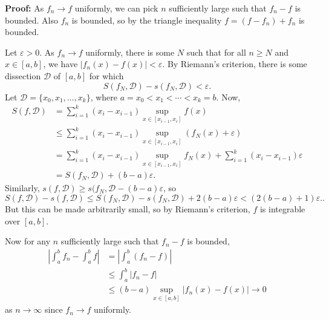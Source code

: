 \documentclass[12pt]{article}
\theoremstyle{definition}
\theoremstyle{remark}
\begin{document}
\begin{adjustbox}{minipage = \columnwidth - 25.5pt, margin=1em, frame=1pt, margin=0em}
	\textbf{Proof:} As $f_n \to f$ uniformly, we can pick $n$ sufficiently large such that $f_n - f$ is bounded. Also $f_n$ is bounded, so by the triangle inequality $f = (f - f_n) + f_n$ is bounded.

	Let $\varepsilon > 0$. As $f_n \to f$ uniformly, there is some $N$ such that for all $n \geq N$ and $x \in [a, b]$, we have $|f_n(x) - f(x)| < \varepsilon$. By Riemann's criterion, there is some dissection $\mathcal{D}$ of $[a, b]$ for which
	\[
		S(f_N, \mathcal{D}) - s(f_N, \mathcal{D}) < \varepsilon
	.\]
	Let $\mathcal{D} = \{x_0, x_1, \ldots, x_k\}$, where $a = x_0 < x_1 < \cdots < x_k = b$. Now,
	\begin{align*}
		S(f, \mathcal{D}) &= \sum_{i = 1}^{k}(x_{i} - x_{i-1}) \sup_{x \in [x_{i-1}, x_{i}]} f(x) \\
				  &\leq \sum_{i = 1}^{k}(x_{i} - x_{i-1}) \sup_{x \in [x_{i-1}, x_i]} (f_N(x) + \varepsilon) \\
				  &= \sum_{i = 1}^{k}(x_{i} - x_{i-1})\sup_{x \in [x_{i-1}, x_i]}f_N(x) + \sum_{i = 1}^{k}(x_{i} - x_{i-1}) \varepsilon \\
				  &= S(f_N, \mathcal{D}) + (b - a) \varepsilon.
	\end{align*}
	Similarly, $s(f, \mathcal{D}) \geq s(f_N, \mathcal{D} - (b - a) \varepsilon$, so
	\[
		S(f, \mathcal{D}) - s(f, \mathcal{D}) \leq S(f_N, \mathcal{D}) - s(f_N, \mathcal{D}) + 2(b - a)\varepsilon < (2(b - a) + 1)\varepsilon.
	.\]
	But this can be made arbitrarily small, so by Riemann's criterion, $f$ is integrable over $[a, b]$.

	Now for any $n$ sufficiently large such that $f_n - f$ is bounded,
	\begin{align*}
		\left| \int_{a}^{b} f_n - \int_{a}^{b}f \right| &= \left| \int_{a}^{b} (f_n - f) \right| \\
								&\leq \int_{a}^{b} |f_n - f| \\
								&\leq (b - a) \sup_{x \in [a, b]}|f_n(x) - f(x)| \to 0
	\end{align*}
	as $n \to \infty$ since $f_n \to f$ uniformly.
\end{adjustbox}

\newpage

\printindex
\end{document}
